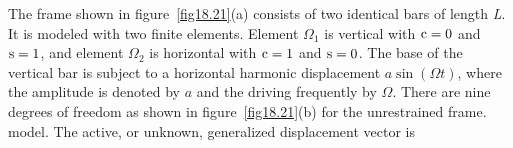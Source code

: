 \documentclass{AeroStructure-ERJohnson}
\begin{document}
\begin{example}\label{ex18.5}\setcounter{equation}{0}\def\theequation{\alph{equation}}The frame shown in figure~\ref{fig18.21}(a) consists of two identical bars of length \textit{L}. It is modeled with two finite elements. Element $\Omega_1$ is vertical with ${\rm c} = 0$ and ${\rm s} =1$, and element $\Omega_2$ is horizontal with ${\rm c} = 1$ and ${\rm s} = 0$. The base of the vertical bar is subject to a horizontal harmonic displacement $a \sin (\Omega t)$, where the amplitude is denoted by $a$ and the driving frequently by $\Omega$. There are nine degrees of freedom as shown in figure~\ref{fig18.21}(b) for the unrestrained frame. model. The active, or unknown, generalized displacement vector is
{\def\thefigure{18.21}
}

\vspace*{-1.6pc}


\end{example}
\end{document}
